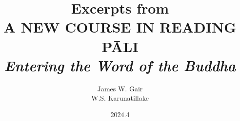 \documentclass[10pt, b5paper]{ctexbook}
\title{
    Excerpts from\\
    \textbf{A NEW COURSE IN READING PĀLI}\\
    \textit{Entering the Word of the Buddha}
}
\author{James W. Gair\\W.S. Karunatillake}
\date{
    \vspace{\fill}
    2024.4
}
\begin{document}
\maketitle
\thispagestyle{empty}

\frontmatter
\tableofcontents

\mainmatter

\begin{sloppypar}

\let\cleardoublepage\relax

\let\cleardoublepage\relax

\let\cleardoublepage\relax

\let\cleardoublepage\relax

\let\cleardoublepage\relax

\let\cleardoublepage\relax

\let\cleardoublepage\relax

\let\cleardoublepage\relax

\let\cleardoublepage\relax

\let\cleardoublepage\relax

\let\cleardoublepage\relax

\let\cleardoublepage\relax
\end{sloppypar}
\end{document}
